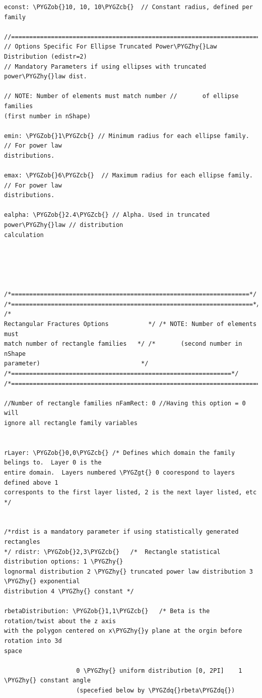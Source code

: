 \documentclass[letterpaper,10pt,english]{sphinxmanual}
\def\PYGZob{\char`\{}
\def\PYGZcb{\char`\}}
\def\PYGZgt{\char`\>}
\def\PYGZhy{\char`\-}
\def\PYGZdq{\char`\"}
\begin{document}
\begin{Verbatim}[commandchars=\\\{\}]
econst: \PYGZob{}10, 10, 10\PYGZcb{}  // Constant radius, defined per family

//===========================================================================
// Options Specific For Ellipse Truncated Power\PYGZhy{}Law Distribution (edistr=2)
// Mandatory Parameters if using ellipses with truncated power\PYGZhy{}law dist.

// NOTE: Number of elements must match number //       of ellipse families
(first number in nShape)

emin: \PYGZob{}1\PYGZcb{} // Minimum radius for each ellipse family.  // For power law
distributions.

emax: \PYGZob{}6\PYGZcb{}  // Maximum radius for each ellipse family.  // For power law
distributions.

ealpha: \PYGZob{}2.4\PYGZcb{} // Alpha. Used in truncated power\PYGZhy{}law // distribution
calculation





/*==================================================================*/
/*===================================================================*/ /*
Rectangular Fractures Options           */ /* NOTE: Number of elements must
match number of rectangle families   */ /*       (second number in nShape
parameter)                            */
/*=============================================================*/
/*======================================================================*/

//Number of rectangle families nFamRect: 0 //Having this option = 0 will
ignore all rectangle family variables


rLayer: \PYGZob{}0,0\PYGZcb{} /* Defines which domain the family belings to.  Layer 0 is the
entire domain.  Layers numbered \PYGZgt{} 0 coorespond to layers defined above 1
corresponts to the first layer listed, 2 is the next layer listed, etc */


/*rdist is a mandatory parameter if using statistically generated rectangles
*/ rdistr: \PYGZob{}2,3\PYGZcb{}   /*  Rectangle statistical distribution options: 1 \PYGZhy{}
lognormal distribution 2 \PYGZhy{} truncated power law distribution 3 \PYGZhy{} exponential
distribution 4 \PYGZhy{} constant */

rbetaDistribution: \PYGZob{}1,1\PYGZcb{}   /* Beta is the rotation/twist about the z axis
with the polygon centered on x\PYGZhy{}y plane at the orgin before rotation into 3d
space

                    0 \PYGZhy{} uniform distribution [0, 2PI]    1 \PYGZhy{} constant angle
                    (specefied below by \PYGZdq{}rbeta\PYGZdq{})


\end{Verbatim}
\end{document}
